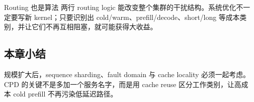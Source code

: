 \begin{importantbox}{Routing 也是算法}
两行 routing logic 能改变整个集群的干扰结构。系统优化不一定要写新 kernel；只要识别出 cold/warm、prefill/decode、short/long 等成本类别，并让它们不再互相阻塞，就可能获得大收益。
\end{importantbox}

\subsection{本章小结}

规模扩大后，sequence sharding、fault domain 与 cache locality 必须一起考虑。CPD 的关键不是多加一个服务名字，而是用 cache reuse 区分工作类别，让高成本 cold prefill 不再污染低延迟路径。

